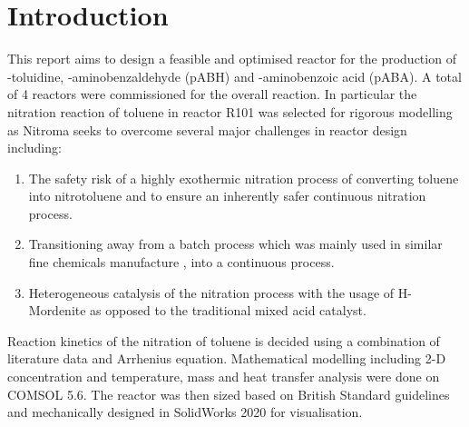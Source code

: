 \section{Introduction}
This report aims to design a feasible and optimised reactor for the production of \ortho-toluidine, \para-aminobenzaldehyde (pABH) and \para-aminobenzoic acid (pABA). A total of 4 reactors were commissioned for the overall reaction. 
In particular the nitration reaction of toluene in reactor R101 was selected for rigorous modelling as Nitroma seeks to overcome several major challenges in reactor design including:

\begin{enumerate}
    \item The safety risk of a highly exothermic nitration process of converting toluene into nitrotoluene and to ensure an inherently safer continuous nitration process. 
    \item Transitioning away from a batch process which was mainly used in similar fine chemicals manufacture \cite{di_miceli_raimondi_safety_2015}, into a continuous process. 
    \item Heterogeneous catalysis of the nitration process with the usage of H-Mordenite as opposed to the traditional mixed acid catalyst. 
\end{enumerate}

Reaction kinetics of the nitration of toluene is decided using a combination of literature data and Arrhenius equation. Mathematical modelling including 2-D concentration and temperature, mass and heat transfer analysis were done on COMSOL 5.6. The reactor was then sized based on British Standard guidelines and mechanically designed in SolidWorks 2020 for visualisation.


